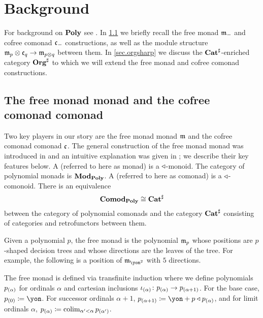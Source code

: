 \chapter{Background} \label{sec:background}

For background on $\mathbf{Poly}$ see \cite{niu2022poly}. In \cref{sec.(co)free(co)monad} we briefly recall the free monad $\mathfrak{m}_-$ and cofree comonad $\mathfrak{c}_-$ constructions, as well as the module structure $\mathfrak{m}_p\otimes\mathfrak{c}_q\to\mathfrak{m}_{p\otimes q}$ between them. In \cref{sec.orgsharp} we discuss the $\mathbf{Cat}^\sharp$-enriched category $\mathbf{Org}^\sharp$ to which we will extend the free monad and cofree comonad constructions.


\section{The free monad monad and the cofree comonad comonad}\label{sec.(co)free(co)monad}

Two key players in our story are the free monad monad $\mathfrak{m}$ and the cofree comonad comonad $\mathfrak{c}$. The general construction of the free monad monad was introduced in \cite{kelly1980unified} and an intuitive explanation was given in \cite{libkind2024pattern}; we describe their key features below. A  (referred to here as monad) is a $\mathbin{\triangleleft}$-monoid. The category of polynomial monads is $\mathbf{Mod}_{\mathbf{Poly}}$. A  (referred to here as comonad) is a $\mathbin{\triangleleft}$-comonoid. There is an equivalence
\[
    \mathbf{Comod}_{\mathbf{Poly}}\cong\mathbf{Cat}^\sharp
\]
between the category of polynomial comonads and the category $\mathbf{Cat}^\sharp$ consisting of categories and retrofunctors between them.

Given a polynomial $p$, the free monad is the polynomial $\mathfrak{m}_p$ whose positions are $p$-shaped decision trees and whose directions are the leaves of the tree. For example, the following is a position of $\free_{\yon^2}$ with $5$ directions. 



The free monad is defined via transfinite induction where we define polynomials $p_{(\alpha)}$ for ordinals $\alpha$ and cartesian inclusions $\iota_{(\alpha)}\colon p_{(\alpha)} \to p_{(\alpha +1)}$. For the base case, $p\hoc{0} \coloneqq \yon$. For successor ordinals $\alpha + 1$, $p\hoc{\alpha + 1} \coloneqq \yon + p \tri p\hoc{\alpha}$, and for limit ordinals $\alpha$, $p_{(\alpha)} \coloneqq \operatorname*{colim}_{\alpha' < \alpha} p _{(\alpha')}$. 


